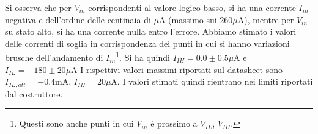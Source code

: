 \documentclass[10pt,a4paper]{article}
\begin{document}
Si osserva che per $V_{in}$ corrispondenti al valore logico basso, si ha una corrente $I_{in}$ negativa e dell'ordine delle centinaia di $\mu \mbox{A}$ (massimo sui $260\mu \mbox{A}$), mentre per $V_{in}$ su stato alto, si ha una corrente nulla entro l'errore.
Abbiamo stimato i valori delle correnti di soglia in corrispondenza dei punti in cui si hanno variazioni brusche dell'andamento di $I_{in}$\footnote{Questi sono anche punti in cui $V_{in}$ è prossimo a $V_{IL}$, $V_{IH}$.}.
Si ha quindi $I_{IH}=0.0\pm0.5\mu \mbox{A}$ e $I_{IL}=-180\pm20\mu\mbox{A}$
I rispettivi valori massimi riportati sul datasheet sono $I_{IL,att}=-0.4\mbox{mA}$, $I_{IH}=20\mu\mbox{A}$. 
I valori stimati quindi rientrano nei limiti riportati dal costruttore. 
\end{document}
